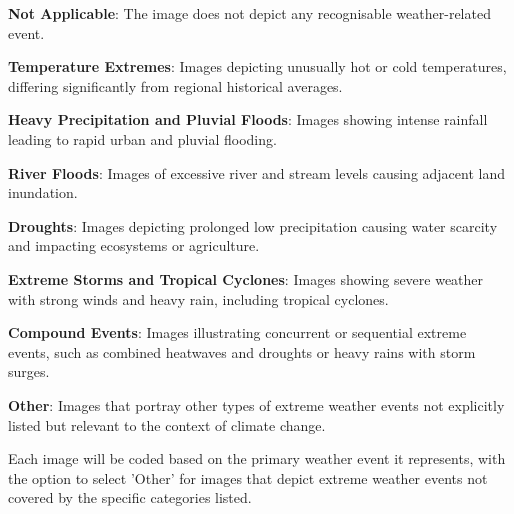 \begin{description}[leftmargin=2.5cm, style = multiline, labelwidth=1.5cm]
\item[0] \textbf{Not Applicable}: The image does not depict any recognisable weather-related event.
\item[1] \textbf{Temperature Extremes}: Images depicting unusually hot or cold temperatures, differing significantly from regional historical averages.
\item[2] \textbf{Heavy Precipitation and Pluvial Floods}: Images showing intense rainfall leading to rapid urban and pluvial flooding.
\item[3] \textbf{River Floods}: Images of excessive river and stream levels causing adjacent land inundation.
\item[4] \textbf{Droughts}: Images depicting prolonged low precipitation causing water scarcity and impacting ecosystems or agriculture.
\item[5] \textbf{Extreme Storms and Tropical Cyclones}: Images showing severe weather with strong winds and heavy rain, including tropical cyclones.
\item[6] \textbf{Compound Events}: Images illustrating concurrent or sequential extreme events, such as combined heatwaves and droughts or heavy rains with storm surges.
\item[7] \textbf{Other}: Images that portray other types of extreme weather events not explicitly listed but relevant to the context of climate change.
\end{description}

Each image will be coded based on the primary weather event it represents, with the option to select 'Other' for images that depict extreme weather events not covered by the specific categories listed.

